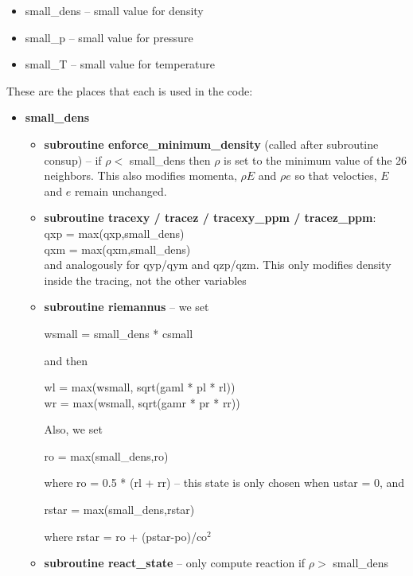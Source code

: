\begin{itemize}
\item small\_dens -- small value for density
\item small\_p -- small value for pressure
\item small\_T -- small value for temperature
\end{itemize}

These are the places that each is used in the code:

\begin{itemize}
\item {\bf small\_dens}  

\begin{itemize}
\item   {\bf subroutine enforce\_minimum\_density} (called after subroutine consup) -- if $\rho < $ small\_dens then $\rho$ is set to the 
minimum value of the 26 neighbors.  This also modifies momenta, $\rho E$ and $\rho e$ so that velocties, $E$ and $e$ remain unchanged. \\

\item   {\bf subroutine tracexy / tracez / tracexy\_ppm / tracez\_ppm}:  \\
qxp = max(qxp,small\_dens) \\
qxm = max(qxm,small\_dens) \\
and analogously for qyp/qym and qzp/qzm.  This only modifies density inside the tracing, not the other variables \\

\item   {\bf subroutine riemannus} -- we set 

\noindent wsmall = small\_dens * csmall

and then

\noindent wl = max(wsmall, sqrt(gaml * pl * rl)) \\
\noindent wr = max(wsmall, sqrt(gamr * pr * rr))

Also, we set 

\noindent ro = max(small\_dens,ro) 

\noindent where ro = 0.5 * (rl + rr)  -- this state is only chosen when ustar = 0, and

\noindent rstar = max(small\_dens,rstar) 

\noindent where rstar = ro + (pstar-po)/co$^2$

\item   {\bf subroutine react\_state} -- only compute reaction if $\rho >$ small\_dens
\end{itemize}


\end{itemize}
